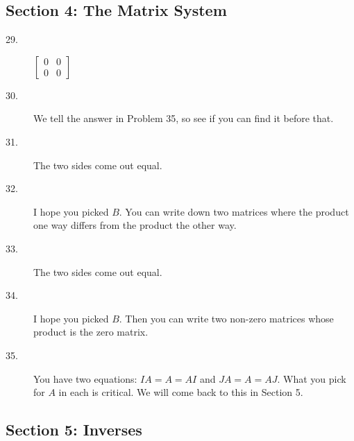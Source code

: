 \documentclass{article}
\begin{document}
\subsection*{Section 4: The Matrix System}

\begin{description}

  \item[29.] $\begin{bmatrix} 0 & 0 \\ 0 & 0 \end{bmatrix}$

  \item[30.] We tell the answer in Problem 35, so see if you can find it before that.

  \item[31.] The two sides come out equal.

  \item[32.] I hope you picked $B$. You can write down two matrices where the product one way differs from the product the other way.

  \item[33.] The two sides come out equal.

  \item[34.] I hope you picked $B$. Then you can write two non-zero matrices whose product is the zero matrix.

  \item[35.] You have two equations: $IA = A = AI$ and $JA = A = AJ$. What you pick for $A$ in each is critical. We will come back to this in Section 5.

\end{description}


\subsection*{Section 5: Inverses}
\end{document}
